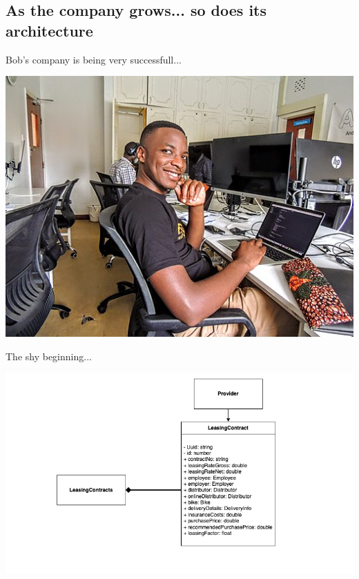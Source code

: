 \subsection{As the company grows... so does its architecture}\label{subsec:company-growth}

\begin{frame}{Bob's company is being very successfull...}
  \begin{center}
    \includegraphics[width=.7\textwidth]{./assets/bob}
  \end{center}
\end{frame}

\begin{frame}{The shy beginning...}
  \begin{center}
    \includegraphics[scale=.5]{./assets/model1}
  \end{center}
\end{frame}


